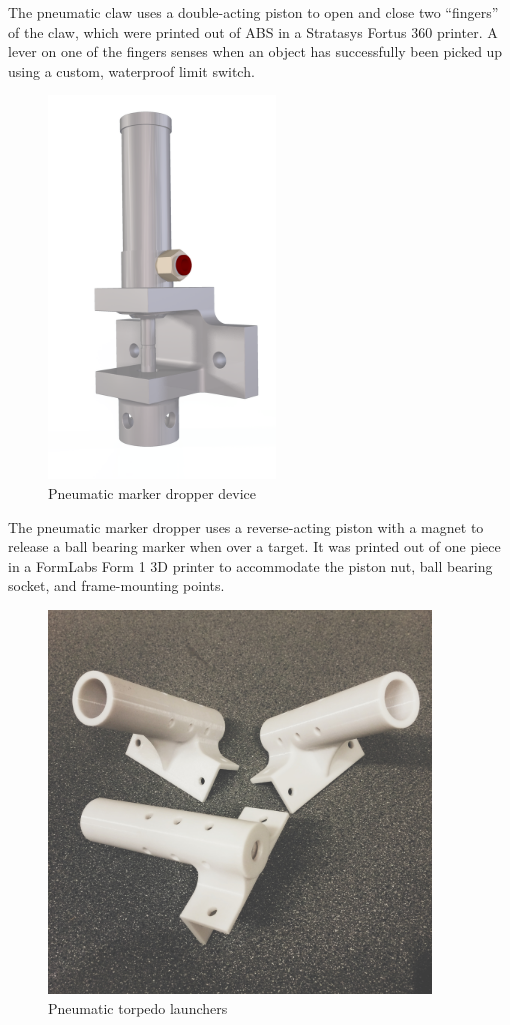 \documentclass[12pt, landscape]{article}
\begin{document}
	The pneumatic claw uses a double-acting piston to open and close two ``fingers'' of the claw, which were printed out of ABS in a Stratasys Fortus 360 printer.  A lever on one of the fingers senses when an object has successfully been picked up using a custom, waterproof limit switch.  

	\begin{figure}[H]
		\centering
		\includegraphics[height=4in]{media/marker_dropper.png}
		\caption{Pneumatic marker dropper device}
		\label{marker}
	\end{figure}

	The pneumatic marker dropper uses a reverse-acting piston with a magnet to release a ball bearing marker when over a target.  It was printed out of one piece in a FormLabs Form 1 3D printer to accommodate the piston nut, ball bearing socket, and frame-mounting points.

	\begin{figure}[H]
		\centering
		\includegraphics[height=4in]{media/launchers}
		\caption{Pneumatic torpedo launchers}
		\label{launcher}
	\end{figure}
\end{document}
